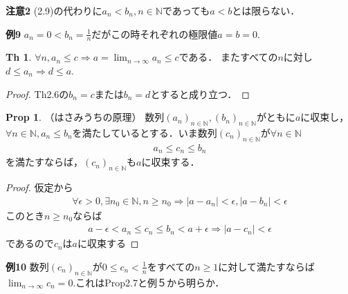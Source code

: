 \documentclass{ltjsarticle}
\theoremstyle{definition}
\newtheorem{prop}[thm]{Prop}
\theoremstyle{propcorollarystyle}
\theoremstyle{thmcorollarystyle}
\newtheorem{thmcor}[thm]{Th}
\begin{document}
\textbf{注意2} (2.9)の代わりに$a_n<b_n,n \in \mathbb{N}$であっても$a<b$とは限らない．

\textbf{例9} $a_n=0<b_n=\frac{1}{n}$だがこの時それぞれの極限値$a=b=0.$

\addtocounter{thm}{-1}
\begin{thmcor}
  $\forall n,a_n \le c \Rightarrow a=\lim_{n \rightarrow \infty} a_n \le c$である．
  またすべての$n$に対し$d \le a_n \Rightarrow d \le a.$
\end{thmcor}
\begin{proof}
  Th2.6の$b_n=c$または$b_n=d$とすると成り立つ．
\end{proof}

\begin{prop}
  （はさみうちの原理）
  数列$(a_n)_{n \in \mathbb{N}},(b_n)_{n \in \mathbb{N}}$がともに$a$に収束し，
  $\forall n \in \mathbb{N},a_n \le b_n$を満たしているとする．いま数列$(c_n)_{n \in \mathbb{N}}$が$\forall n \in \mathbb{N}$
  \begin{align*}
    a_n \le c_n \le b_n
  \end{align*}
  を満たすならば，$(c_n)_{n \in \mathbb{N}}$も$a$に収束する．
\end{prop}
\begin{proof}
  仮定から
  \begin{align*}
    \forall \epsilon >0,\exists n_0 \in \mathbb{N},n \ge n_0 \Rightarrow |a-a_n|<\epsilon,|a-b_n|<\epsilon
  \end{align*}
  このとき$n \ge n_0$ならば
  \begin{align*}
    a-\epsilon <a_n \le c_n \le b_n <a+\epsilon \Rightarrow |a-c_n|<\epsilon
  \end{align*}
  であるので$c_n$は$a$に収束する
\end{proof}

\textbf{例10} 数列$(c_n)_{n \in \mathbb{N}}$が$0 \le c_n <\frac{1}{n}$をすべての$n\ge 1$に対して満たすならば
$\lim_{n \rightarrow \infty} c_n=0.$これはProp2.7と例５から明らか．
\end{document}

